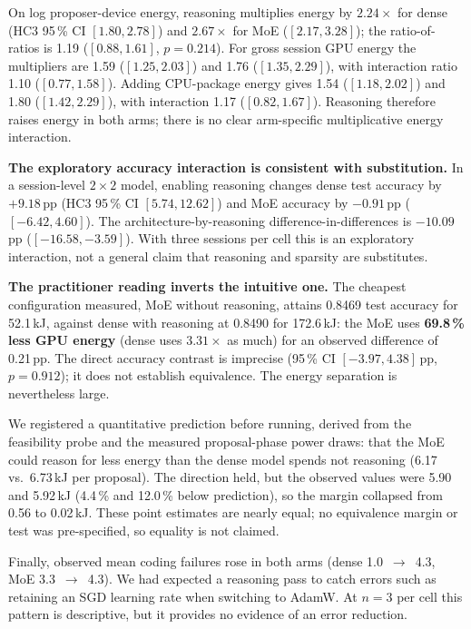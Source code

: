 On log proposer-device energy, reasoning multiplies energy by $2.24\times$ for
dense (HC3 95\,\% CI $[1.80,2.78]$) and $2.67\times$ for MoE
($[2.17,3.28]$); the ratio-of-ratios is 1.19 ($[0.88,1.61]$, $p=0.214$).
For gross session GPU energy the multipliers are 1.59 ($[1.25,2.03]$) and 1.76
($[1.35,2.29]$), with interaction ratio 1.10 ($[0.77,1.58]$). Adding CPU-package
energy gives 1.54 ($[1.18,2.02]$) and 1.80 ($[1.42,2.29]$), with interaction
1.17 ($[0.82,1.67]$). Reasoning therefore raises energy in both arms; there is
no clear arm-specific multiplicative energy interaction.

\textbf{The exploratory accuracy interaction is consistent with substitution.} In a
session-level $2\times2$ model, enabling reasoning changes dense test accuracy by
$+9.18$\,pp (HC3 95\,\% CI $[5.74,12.62]$) and MoE accuracy by $-0.91$\,pp
($[-6.42,4.60]$). The architecture-by-reasoning difference-in-differences is
$-10.09$\,pp ($[-16.58,-3.59]$). With three sessions per cell this is an
exploratory interaction, not a general claim that reasoning and sparsity are
substitutes.

\textbf{The practitioner reading inverts the intuitive one.} The cheapest
configuration measured, MoE without reasoning, attains 0.8469 test accuracy for
52.1\,kJ, against dense with reasoning at 0.8490 for 172.6\,kJ: the MoE uses
\textbf{69.8\,\% less GPU energy} (dense uses $3.31\times$ as much) for an
observed difference of 0.21\,pp. The direct accuracy
contrast is imprecise (95\,\% CI $[-3.97,4.38]$\,pp, $p=0.912$); it does not
establish equivalence. The energy separation is nevertheless large.

We registered a quantitative prediction before running, derived from the
feasibility probe and the measured proposal-phase power draws: that the MoE could
reason for less energy than the dense model spends not reasoning (6.17 vs.\
6.73\,kJ per proposal). The direction held, but the observed values were 5.90
and 5.92\,kJ (4.4\,\% and 12.0\,\% below prediction), so the margin collapsed
from 0.56 to 0.02\,kJ. These point estimates are nearly equal; no equivalence margin or test
was pre-specified, so equality is not claimed.

Finally, observed mean coding failures rose
in both arms (dense 1.0~$\rightarrow$~4.3, MoE 3.3~$\rightarrow$~4.3). We had
expected a reasoning pass to catch errors such as retaining an SGD learning rate
when switching to AdamW. At $n=3$ per cell this pattern is descriptive, but it
provides no evidence of an error reduction.

